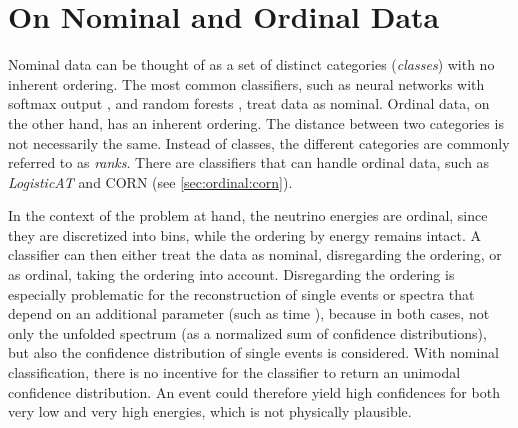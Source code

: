 \section{On Nominal and Ordinal Data}
Nominal data can be thought of as a set of distinct categories
  (\emph{classes})
with no inherent ordering.
The most common classifiers,
  such as
    neural networks with softmax output \cite{dsea_samuel},
    and random forests \cite{hymon2021seasonal},
treat data as nominal.
%
Ordinal data, on the other hand,
has an inherent ordering.
The distance between two categories is not necessarily the same. %
Instead of classes,
  the different categories are commonly referred to as \emph{ranks}.
There are classifiers that can handle ordinal data,
such as
  \emph{LogisticAT} \cite{logisticat, dsea_jan} %
  and \ac{CORN} (see \autoref{sec:ordinal:corn}).

In the context of the problem at hand,
  the neutrino energies are ordinal,
    since they are discretized into bins,
      while the ordering by energy remains intact.
%
A classifier can then either
  treat the data as nominal,
    disregarding the ordering,
  or as ordinal,
    taking the ordering into account.
Disregarding the ordering
is especially problematic for the reconstruction of
  single events
  or spectra that depend on an additional parameter
    (such as time \cite{hymon2021seasonal}),
because in both cases,
  not only the unfolded spectrum
    (as a normalized sum of confidence distributions),
  but also the confidence distribution of single events
  is considered.
With nominal classification,
  there is no incentive for the classifier
    to return an unimodal confidence distribution.
An event could therefore yield
  high confidences for both very low and very high energies,
  which is not physically plausible.


